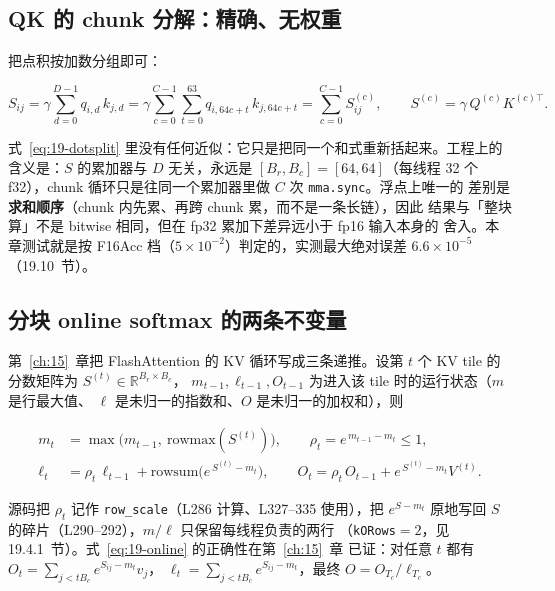 \subsection{QK 的 chunk 分解：精确、无权重}

把点积按加数分组即可：

\begin{equation}
  S_{ij} = \gamma \sum_{d=0}^{D-1} q_{i,d}\, k_{j,d}
         = \gamma \sum_{c=0}^{C-1} \sum_{t=0}^{63} q_{i,64c+t}\, k_{j,64c+t}
         = \sum_{c=0}^{C-1} S^{(c)}_{ij} ,
  \qquad
  S^{(c)} = \gamma\, Q^{(c)} K^{(c)\top} .
  \label{eq:19-dotsplit}
\end{equation}

式~\ref{eq:19-dotsplit} 里没有任何近似：它只是把同一个和式重新括起来。工程上的
含义是：$S$ 的累加器与 $D$ 无关，永远是 $[B_r, B_c] = [64,64]$（每线程 32 个
f32），chunk 循环只是往同一个累加器里做 $C$ 次 \texttt{mma.sync}。浮点上唯一的
差别是\textbf{求和顺序}（chunk 内先累、再跨 chunk 累，而不是一条长链），因此
结果与「整块算」不是 bitwise 相同，但在 fp32 累加下差异远小于 fp16 输入本身的
舍入。本章测试就是按 F16Acc 档（$5\times10^{-2}$）判定的，实测最大绝对误差
$6.6\times10^{-5}$（19.10~节）。

\subsection{分块 online softmax 的两条不变量}

第~\ref{ch:15}~章把 FlashAttention 的 KV 循环写成三条递推。设第 $t$ 个 KV tile
的分数矩阵为 $S^{(t)} \in \mathbb{R}^{B_r \times B_c}$，
$m_{t-1}, \ell_{t-1}, O_{t-1}$ 为进入该 tile 时的运行状态（$m$ 是行最大值、
$\ell$ 是未归一的指数和、$O$ 是未归一的加权和），则

\begin{equation}
  \begin{aligned}
    m_t &= \max\bigl(m_{t-1},\ \mathrm{rowmax}(S^{(t)})\bigr), \qquad
    \rho_t = e^{\,m_{t-1} - m_t} \le 1 , \\
    \ell_t &= \rho_t\, \ell_{t-1} + \mathrm{rowsum}\bigl(e^{\,S^{(t)} - m_t}\bigr), \qquad
    O_t = \rho_t\, O_{t-1} + e^{\,S^{(t)} - m_t} V^{(t)} .
  \end{aligned}
  \label{eq:19-online}
\end{equation}

源码把 $\rho_t$ 记作 \texttt{row\_scale}（L286 计算、L327--335 使用），把
$e^{S - m_t}$ 原地写回 $S$ 的碎片（L290--292），$m/\ell$ 只保留每线程负责的两行
（\texttt{kORows}$=2$，见 19.4.1~节）。式~\ref{eq:19-online} 的正确性在第~\ref{ch:15}~章
已证：对任意 $t$ 都有 $O_t = \sum_{j < t B_c} e^{S_{ij} - m_t} v_j$，
$\ell_t = \sum_{j<tB_c} e^{S_{ij}-m_t}$，最终 $O = O_{T_c}/\ell_{T_c}$。

